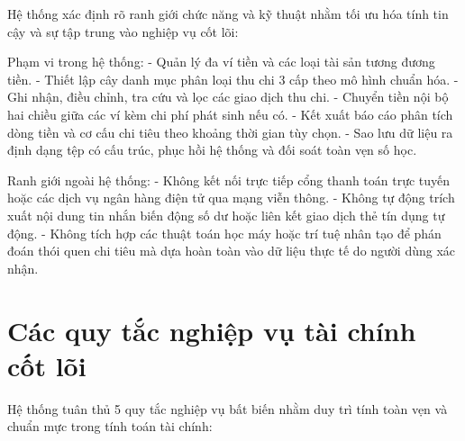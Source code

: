 \documentclass[a4paper,12pt]{report}
\begin{document}
Hệ thống xác định rõ ranh giới chức năng và kỹ thuật nhằm tối ưu hóa
tính tin cậy và sự tập trung vào nghiệp vụ cốt lõi:

Phạm vi trong hệ thống: - Quản lý đa ví tiền và các loại tài sản tương
đương tiền. - Thiết lập cây danh mục phân loại thu chi 3 cấp theo mô
hình chuẩn hóa. - Ghi nhận, điều chỉnh, tra cứu và lọc các giao dịch thu
chi. - Chuyển tiền nội bộ hai chiều giữa các ví kèm chi phí phát sinh
nếu có. - Kết xuất báo cáo phân tích dòng tiền và cơ cấu chi tiêu theo
khoảng thời gian tùy chọn. - Sao lưu dữ liệu ra định dạng tệp có cấu
trúc, phục hồi hệ thống và đối soát toàn vẹn số học.

Ranh giới ngoài hệ thống: - Không kết nối trực tiếp cổng thanh toán trực
tuyến hoặc các dịch vụ ngân hàng điện tử qua mạng viễn thông. - Không tự
động trích xuất nội dung tin nhắn biến động số dư hoặc liên kết giao
dịch thẻ tín dụng tự động. - Không tích hợp các thuật toán học máy hoặc
trí tuệ nhân tạo để phán đoán thói quen chi tiêu mà dựa hoàn toàn vào dữ
liệu thực tế do người dùng xác nhận.

\section{Các quy tắc nghiệp vụ tài chính cốt
lõi}\label{cuxe1c-quy-tux1eafc-nghiux1ec7p-vux1ee5-tuxe0i-chuxednh-cux1ed1t-luxf5i}

Hệ thống tuân thủ 5 quy tắc nghiệp vụ bất biến nhằm duy trì tính toàn
vẹn và chuẩn mực trong tính toán tài chính:
\end{document}
